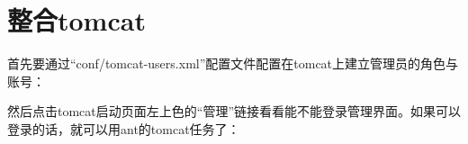 \chapter{整合tomcat}


首先要通过“conf/tomcat-users.xml”配置文件配置在tomcat上建立管理员的角色与账号：



然后点击tomcat启动页面左上色的“管理”链接看看能不能登录管理界面。如果可以登录的话，就可以用ant的tomcat任务了：






